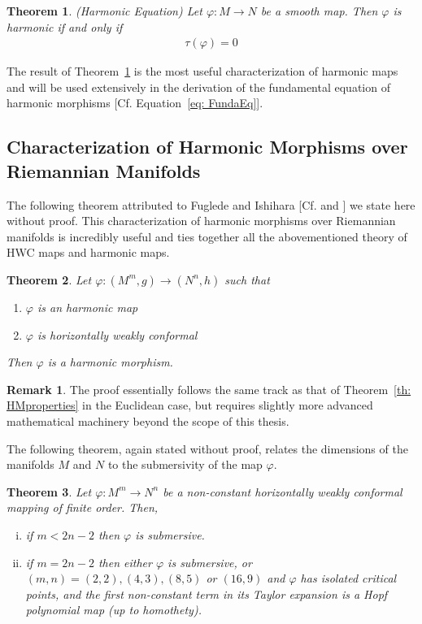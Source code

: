 \documentclass[12pt]{article}
\newtheorem{theorem}{Theorem}[section]
\theoremstyle{definition}
\newtheorem{remark}{Remark}[subsection]
\numberwithin{equation}{subsection}
\begin{document}
\begin{theorem}\label{th:HarmEq}
(Harmonic Equation) Let $\varphi: M \rightarrow N$ be a smooth map. Then $\varphi$ is \textit{harmonic} if and only if 
\begin{align}
    \tau(\varphi) = 0
\end{align}
\end{theorem}

The result of Theorem~\ref{th:HarmEq} is the most useful characterization of harmonic maps and will be used extensively in the derivation of the fundamental equation of harmonic morphisms [Cf. Equation~\ref{eq: FundaEq}].

\subsection{Characterization of Harmonic Morphisms over Riemannian Manifolds}
The following theorem attributed to Fuglede and Ishihara [Cf. \cite{Fuglede} and \cite{Ishihara}] we state here without proof. This characterization of harmonic morphisms over Riemannian manifolds is incredibly useful and ties together all the abovementioned theory of  HWC maps and harmonic maps. 
\begin{theorem} \label{th:harmM + HWC = HM}
Let $\varphi: (M^m, g) \rightarrow (N^n, h)$ such that 
\begin{enumerate}
    \item $\varphi$ is an harmonic map
    \item $\varphi$ is horizontally weakly conformal
\end{enumerate}
    Then $\varphi$ is a harmonic morphism.
\end{theorem}

\begin{remark}
The proof essentially follows the same track as that of Theorem~\ref{th: HMproperties} in the Euclidean case, but requires slightly more advanced mathematical machinery beyond the scope of this thesis. 
\end{remark}

The following theorem, again stated without proof, relates the dimensions of the manifolds $M$ and $N$ to the submersivity of the map $\varphi$.

\begin{theorem} \label{th: submersion/dimension}
Let $\varphi:M^m \rightarrow N^n$ be a non-constant horizontally weakly conformal mapping of finite order. Then,
\begin{enumerate}[(i)]
    \item if $m < 2n -2$ then $\varphi$ is submersive.
    \item if $m = 2n -2$ then either $\varphi$ is submersive, or $(m,n) = (2,2), (4,3), (8,5)$ or $(16,9)$ and $\varphi$ has isolated critical points, and the first non-constant term in its Taylor expansion  is a Hopf polynomial map (up to homothety). 
\end{enumerate}
\end{theorem}
\end{document}

